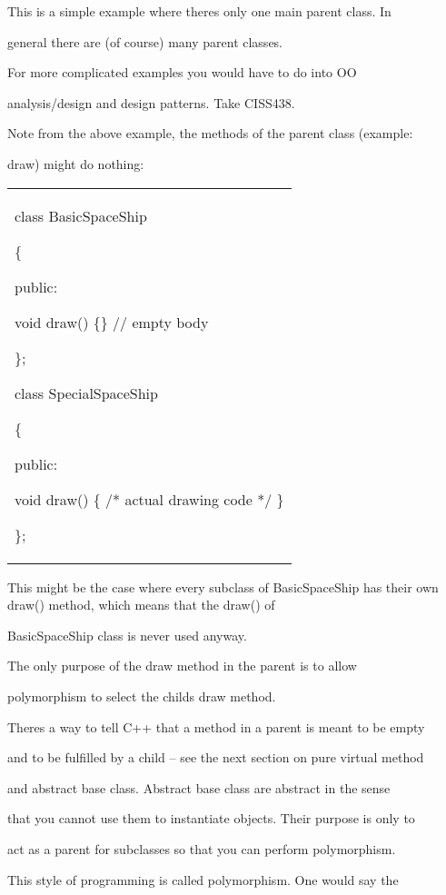 \documentclass[
]{article}
\begin{document}
This is a simple example where there\textquotesingle s only one main
parent class. In

general there are (of course) many parent classes.

For more complicated examples you would have to do into OO

analysis/design and design patterns. Take CISS438.

Note from the above example, the methods of the parent class (example:

draw) might do nothing:

\begin{longtable}[]{@{}
  >{\raggedright\arraybackslash}p{}@{}}
\toprule\noalign{}
 \\
\midrule\noalign{}
\endhead
\bottomrule\noalign{}
\endlastfoot
class BasicSpaceShip

\{

public:

void draw() \{\} // empty body

\};

class SpecialSpaceShip

\{

public:

void draw() \{ /* actual drawing code */ \}

\}; \\
\end{longtable}

This might be the case where every subclass of BasicSpaceShip has their
own draw() method, which means that the draw() of

BasicSpaceShip class is never used anyway.

The only purpose of the draw method in the parent is to allow

polymorphism to select the child\textquotesingle s draw method.

There\textquotesingle s a way to tell C++ that a method in a parent is
meant to be empty

and to be fulfilled by a child -- see the next section on pure virtual
method

and abstract base class. Abstract base class are abstract in the sense

that you cannot use them to instantiate objects. Their purpose is only
to

act as a parent for subclasses so that you can perform polymorphism.

This style of programming is called polymorphism. One would say the
\end{document}
